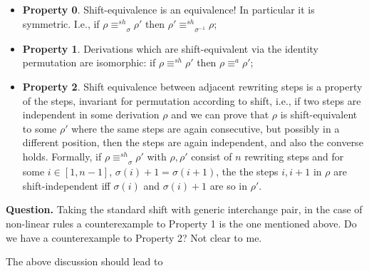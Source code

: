 \documentclass{llncs}
\newcommand{\interval}[2][1]{\ensuremath{[{#1},{#2}]}}
\newcommand{\shifteq}[1][]{\ensuremath{\mathrel{{\equiv}^\mathit{sh}_{#1}}}}
\begin{document}
\begin{itemize}
\item \textbf{Property 0}. Shift-equivalence is an equivalence! In
  particular it is symmetric. I.e., if $\rho \shifteq_\sigma \rho'$
  then $\rho' \shifteq_{\sigma^{-1}} \rho$;

\item \textbf{Property 1}. Derivations which are shift-equivalent via the
  identity permutation are isomorphic: if $\rho \shifteq \rho'$ then
  $\rho \equiv^a \rho'$; 
  
\item \textbf{Property 2}. Shift equivalence between adjacent rewriting steps
  is a property of the steps, invariant for permutation according to
  shift, i.e., if two steps are independent in some derivation $\rho$
  and we can prove that $\rho$ is shift-equivalent to some $\rho'$
  where the same steps are again consecutive, but possibly in a
  different position, then the steps are again independent, and also
  the converse holds. Formally, if $\rho \shifteq_\sigma \rho'$ with
  $\rho, \rho'$ consist of $n$ rewriting steps and for some
  $i \in \interval{n-1}$, $\sigma(i)+1 = \sigma(i+1)$, the the steps
  $i, i+1$ in $\rho$ are shift-independent iff $\sigma(i)$ and
  $\sigma(i)+1$ are so in $\rho'$.
\end{itemize}




\textbf{Question.} Taking the standard shift with generic interchange
pair, in the case of non-linear rules a counterexample to Property 1
is the one mentioned above.  Do we have a counterexample to Property
2? Not clear to me.


The above discussion should lead to
\end{document}

